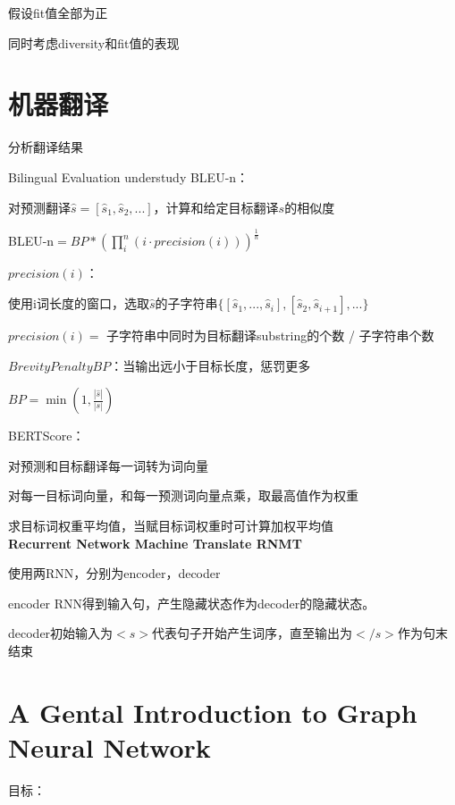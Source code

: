 \documentclass[UTF8]{ctexart}
\begin{document}
  \quad \quad \quad 假设fit值全部为正

  \quad \quad \quad 同时考虑diversity和fit值的表现

\section{机器翻译}
\noindent 分析翻译结果

  Bilingual Evaluation understudy BLEU-n：

  \quad 对预测翻译$\hat{s} = [\hat{s}_1, \hat{s}_2, ...]$，计算和给定目标翻译$s$的相似度

  \quad BLEU-n$ = BP * (\prod_i^n (i \cdot precision(i)))^{\frac{1}{n}}$

  \quad \quad $precision(i)$：
  
  \quad \quad \quad 使用i词长度的窗口，选取$\hat{s}$的子字符串$\{ [\hat{s}_1, ..., \hat{s}_i], [\hat{s}_2, \hat{s}_{i+1}], ... \}$

  \quad \quad \quad $precision(i) = $ 子字符串中同时为目标翻译substring的个数 / 子字符串个数

  \quad \quad $Brevity Penalty BP$：当输出远小于目标长度，惩罚更多

  \quad \quad \quad $BP = \min(1, \frac{|\hat{s}|}{|s|})$

  BERTScore：

  \quad 对预测和目标翻译每一词转为词向量

  \quad 对每一目标词向量，和每一预测词向量点乘，取最高值作为权重

  \quad 求目标词权重平均值，当赋目标词权重时可计算加权平均值\\
\textbf{Recurrent Network Machine Translate RNMT}

  使用两RNN，分别为encoder，decoder

  encoder RNN得到输入句，产生隐藏状态作为decoder的隐藏状态。
  
  decoder初始输入为$<s>$代表句子开始产生词序，直至输出为$</s>$作为句末结束

\section{A Gental Introduction to Graph Neural Network}
\noindent 目标：
\end{document}
